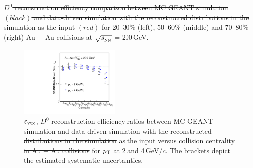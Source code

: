 \documentclass[%
 reprint,	
 amsmath,amssymb,
 aps,
 prc,
]{revtex4-1}
\providecommand{\DIFaddtex}[1]{{\protect\color{blue}\uwave{#1}}} %
\providecommand{\DIFdeltex}[1]{{\protect\color{red}\sout{#1}}}                      %
\providecommand{\DIFdelbegin}{} %
\providecommand{\DIFdelend}{} %
\providecommand{\DIFaddFL}[1]{\DIFadd{#1}} %
\providecommand{\DIFdelFL}[1]{\DIFdel{#1}} %
\providecommand{\DIFaddbeginFL}{} %
\providecommand{\DIFaddendFL}{} %
\providecommand{\DIFdelbeginFL}{} %
\providecommand{\DIFdelendFL}{} %
\providecommand{\DIFadd}[1]{\texorpdfstring{\DIFaddtex{#1}}{#1}} %
\providecommand{\DIFdel}[1]{\texorpdfstring{\DIFdeltex{#1}}{}} %
\begin{document}
\DIFdelbegin %
{%
\DIFdelFL{$D^{0}$ reconstruction efficiency comparison between MC GEANT simulation $(black)$ and  data-driven simulation with the reconstructed distributions in the simulation as the input $(red)$ for 20--30\% (left), 50--60\% (middle) and 70--80\% (right) Au + Au collisions at $\sqrt{s_{_{\rm NN}}}$ = 200\,GeV.}}

\DIFdelend \begin{figure}
\centering
\includegraphics[width=0.43\textwidth]{fig/Mcd0Eff_20_80_vsCent.pdf}
\caption{$\varepsilon_{\rm vtx}$, $D^0$ reconstruction efficiency ratios between MC GEANT simulation and data-driven simulation with the reconstructed \DIFdelbeginFL \DIFdelFL{distributions in the simulation }\DIFdelendFL \DIFaddbeginFL \DIFaddFL{MC data }\DIFaddendFL as the input versus collision centrality \DIFdelbeginFL \DIFdelFL{in Au + Au collisions }\DIFdelendFL for \DIFdelbeginFL \DIFdelFL{$p_{\rm T}$ }\DIFdelendFL \DIFaddbeginFL \DIFaddFL{$p_{T}$ }\DIFaddendFL at 2 and 4\,GeV/$c$. The brackets depict the estimated systematic uncertainties.}
\label{fig:Mcd0Eff_20_80_vsCent} 
\end{figure}
\end{document}
